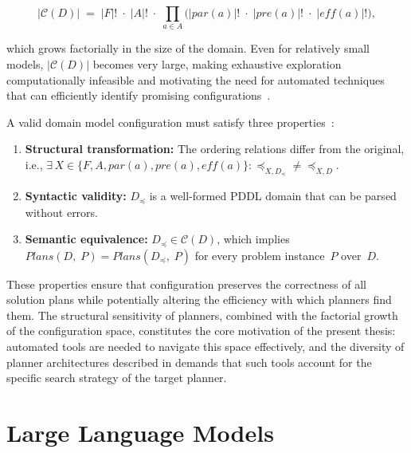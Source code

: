 \begin{equation}\label{eq:config_space}
  |\mathcal{C}(D)| \;=\; |F|! \;\cdot\; |A|! \;\cdot\; \prod_{a \in A} \bigl( |\mathit{par}(a)|! \;\cdot\; |\mathit{pre}(a)|! \;\cdot\; |\mathit{eff}(a)|! \bigr),
\end{equation}

\noindent which grows factorially in the size of the domain.
Even for relatively small models, $|\mathcal{C}(D)|$ becomes very large, making exhaustive exploration computationally infeasible and motivating the need for automated techniques that can efficiently identify promising configurations~\cite{Vallati2021}.

A valid domain model configuration must satisfy three properties~\cite{Georgievski2025}:
\begin{enumerate}
  \item \textbf{Structural transformation:} The ordering relations differ from the original, i.e., $\exists\, X \in \{F, A, \mathit{par}(a), \mathit{pre}(a), \mathit{eff}(a)\} : {\preceq_{X, D_{\preceq}}} \neq {\preceq_{X, D}}$.
  \item \textbf{Syntactic validity:} $D_{\preceq}$ is a well-formed PDDL domain that can be parsed without errors.
  \item \textbf{Semantic equivalence:} $D_{\preceq} \in \mathcal{C}(D)$, which implies $\mathit{Plans}(D,\; P) = \mathit{Plans}(D_{\preceq},\; P)$ for every problem instance~$P$ over~$D$.
\end{enumerate}

\noindent These properties ensure that configuration preserves the correctness of all solution plans while potentially altering the efficiency with which planners find them.
The structural sensitivity of planners, combined with the factorial growth of the configuration space, constitutes the core motivation of the present thesis: automated tools are needed to navigate this space effectively, and the diversity of planner architectures described in  demands that such tools account for the specific search strategy of the target planner.

\section{Large Language Models}
\label{sec:bg:llms}

